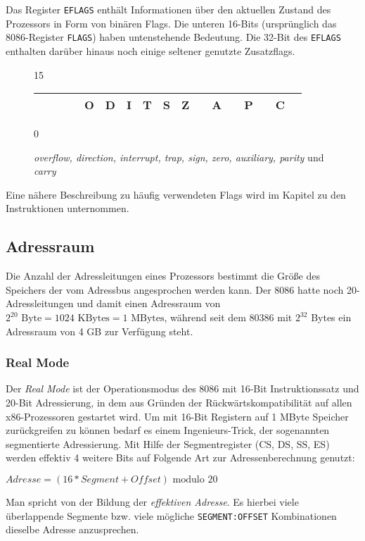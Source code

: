 Das Register {\tt EFLAGS} enthält Informationen über den aktuellen Zustand des Prozessors in Form von binären Flags. Die unteren 16-Bits (ursprünglich das 8086-Register {\tt FLAGS}) haben untenstehende Bedeutung. Die 32-Bit des {\tt EFLAGS} enthalten darüber hinaus noch einige seltener genutzte Zusatzflags.
\begin{figure}[h]
  \begin{center}
	{\small 15}
	\begin{tabular}{|c|c|c|c|c|c|c|c|c|c|c|c|c|c|c|c|c|}
	\hline & & & & O & D & I & T & S & Z & & A & & P & & C \\
	\hline
	\end{tabular}
	{\small 0}
  \end{center}
  \caption{\emph{overflow, direction, interrupt, trap, sign, zero, auxiliary, parity}
und \emph{carry}}
\end{figure}

Eine nähere Beschreibung zu häufig verwendeten Flags wird im Kapitel zu den Instruktionen unternommen.

\subsection{Adressraum}

Die Anzahl der Adressleitungen eines Prozessors bestimmt die Größe des Speichers der vom Adressbus angesprochen werden kann. Der 8086 hatte noch 20-Adressleitungen und damit einen Adressraum von $2^{20} \text{ Byte} = 1024 \text{ KBytes} = 1 \text{ MBytes}$, während seit dem 80386 mit $2^{32}$ Bytes ein Adressraum von 4 GB zur Verfügung steht.

\subsubsection{Real Mode}

Der \emph{Real Mode} ist der Operationsmodus des 8086 mit 16-Bit Instruktionssatz und 20-Bit Adressierung, in dem aus Gründen der Rückwärtskompatibilität auf allen x86-Prozessoren gestartet wird. Um mit 16-Bit Registern auf 1 MByte Speicher zurückgreifen zu können bedarf es einem Ingenieurs-Trick, der sogenannten segmentierte Adressierung. Mit Hilfe der Segmentregister (CS, DS, SS, ES) werden effektiv 4 weitere Bits auf Folgende Art zur Adressenberechnung genutzt:

$Adresse = (16 * Segment + Offset) \text{ modulo } 20$

Man spricht von der Bildung der \emph{effektiven Adresse}. Es hierbei viele überlappende Segmente bzw. viele mögliche \texttt{SEGMENT:OFFSET} Kombinationen dieselbe Adresse anzusprechen.

